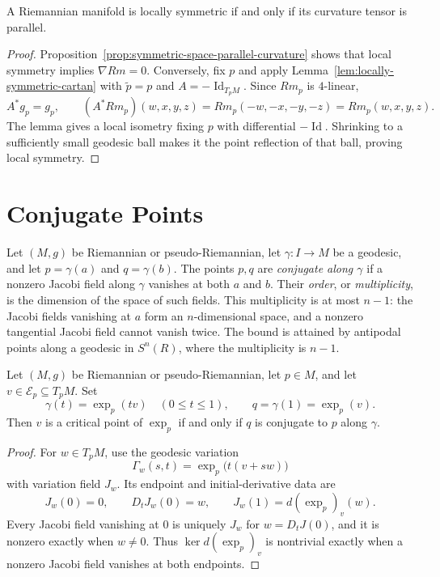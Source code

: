 \begin{theorem}
\label{thm:characterization-locally-symmetric-spaces}


A Riemannian manifold is locally symmetric if and only if its curvature
tensor is parallel.

\begin{proof}
\sketch Proposition~\ref{prop:symmetric-space-parallel-curvature} shows that
local symmetry implies $\nabla Rm=0$.
Conversely, fix $p$ and apply
Lemma~\ref{lem:locally-symmetric-cartan} with $\widetilde p=p$ and
$A=-\operatorname{Id}_{T_pM}$. Since $Rm_p$ is $4$-linear,
\[
A^*g_p=g_p,
\qquad
(A^*Rm_p)(w,x,y,z)=Rm_p(-w,-x,-y,-z)=Rm_p(w,x,y,z).
\]
The lemma gives a local isometry fixing $p$ with differential
$-\operatorname{Id}$. Shrinking to a sufficiently small geodesic ball makes
it the point reflection of that ball, proving local symmetry.
\end{proof}
\end{theorem}

\section{Conjugate Points}

Let $(M,g)$ be Riemannian or pseudo-Riemannian, let $\gamma:I\to M$ be a
geodesic, and let $p=\gamma(a)$ and $q=\gamma(b)$. The points $p,q$ are
\emph{conjugate along $\gamma$} if a nonzero Jacobi field along $\gamma$
vanishes at both $a$ and $b$. Their \emph{order}, or \emph{multiplicity}, is
the dimension of the space of such fields. This multiplicity is at most
$n-1$: the Jacobi fields vanishing at $a$ form an $n$-dimensional space, and
a nonzero tangential Jacobi field cannot vanish twice. The bound is attained
by antipodal points along a geodesic in $S^n(R)$, where the multiplicity is
$n-1$.

\begin{proposition}
\label{prop:critical-points-conjugate}





Let $(M,g)$ be Riemannian or pseudo-Riemannian, let $p\in M$, and let
$v\in\mathcal E_p\subseteq T_pM$. Set
\[
\gamma(t)=\exp_p(tv)\quad(0\leq t\leq1),
\qquad
q=\gamma(1)=\exp_p(v).
\]
Then $v$ is a critical point of $\exp_p$ if and only if $q$ is conjugate to
$p$ along $\gamma$.

\begin{proof}
\sketch For $w\in T_pM$, use the geodesic variation
\[
\Gamma_w(s,t)=\exp_p\bigl(t(v+sw)\bigr)
\]
with variation field $J_w$. Its endpoint and initial-derivative data are
\[
J_w(0)=0,\qquad D_tJ_w(0)=w,\qquad
J_w(1)=d(\exp_p)_v(w).
\]
Every Jacobi field vanishing at $0$ is uniquely $J_w$ for
$w=D_tJ(0)$, and it is nonzero exactly when $w\neq0$. Thus
$\ker d(\exp_p)_v$ is nontrivial exactly when a nonzero Jacobi field vanishes
at both endpoints.
\end{proof}
\end{proposition}

